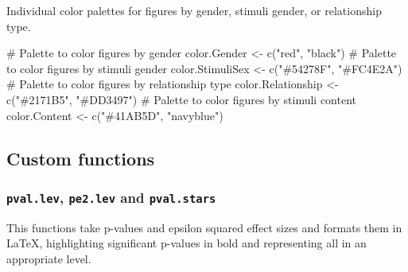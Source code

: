\documentclass[
  bookmarksnumbered]{article}
\newenvironment{Shaded}{\begin{snugshade}}{\end{snugshade}}
\newcommand{\CommentTok}[1]{\textcolor[rgb]{0.50,0.62,0.50}{#1}}
\newcommand{\FunctionTok}[1]{\textcolor[rgb]{0.94,0.94,0.56}{#1}}
\newcommand{\NormalTok}[1]{\textcolor[rgb]{0.80,0.80,0.80}{#1}}
\newcommand{\OtherTok}[1]{\textcolor[rgb]{0.94,0.94,0.56}{#1}}
\newcommand{\StringTok}[1]{\textcolor[rgb]{0.80,0.58,0.58}{#1}}
\begin{document}
Individual color palettes for figures by gender, stimuli gender, or relationship type.

\begin{Shaded}
\begin{Highlighting}[]
\CommentTok{\# Palette to color figures by gender}
\NormalTok{color.Gender }\OtherTok{\textless{}{-}} \FunctionTok{c}\NormalTok{(}\StringTok{"red"}\NormalTok{, }\StringTok{"black"}\NormalTok{)}
\CommentTok{\# Palette to color figures by stimuli gender}
\NormalTok{color.StimuliSex }\OtherTok{\textless{}{-}} \FunctionTok{c}\NormalTok{(}\StringTok{"\#54278F"}\NormalTok{, }\StringTok{"\#FC4E2A"}\NormalTok{)}
\CommentTok{\# Palette to color figures by relationship type}
\NormalTok{color.Relationship }\OtherTok{\textless{}{-}} \FunctionTok{c}\NormalTok{(}\StringTok{"\#2171B5"}\NormalTok{, }\StringTok{"\#DD3497"}\NormalTok{)}
\CommentTok{\# Palette to color figures by stimuli content}
\NormalTok{color.Content }\OtherTok{\textless{}{-}} \FunctionTok{c}\NormalTok{(}\StringTok{"\#41AB5D"}\NormalTok{, }\StringTok{"navyblue"}\NormalTok{)}
\end{Highlighting}
\end{Shaded}

\subsection{Custom functions}\label{custom-functions}

\subsubsection{\texorpdfstring{\texttt{pval.lev}, \texttt{pe2.lev} and \texttt{pval.stars}}{pval.lev, pe2.lev and pval.stars}}\label{pval.lev-pe2.lev-and-pval.stars}

This functions take p-values and epsilon squared effect sizes and formats them in \LaTeX, highlighting significant p-values in bold and representing all in an appropriate level.
\end{document}
